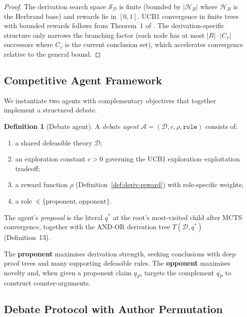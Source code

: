 \documentclass{article}
\theoremstyle{definition}
\newtheorem{definition}[theorem]{Definition}
\newcommand{\D}{\mathcal{D}}
\newcommand{\comp}[1]{\overline{#1}}
\newcommand{\SD}{\mathcal{S}_{\D}}
\begin{document}
\begin{proof}
The derivation search space $\SD$ is finite (bounded by $|\mathcal{H}_B|$ where $\mathcal{H}_B$ is the Herbrand base) and rewards lie in $[0,1]$. UCB1 convergence in finite trees with bounded rewards follows from Theorem~1 of \citet{kocsis2006mcts}. The derivation-specific structure only narrows the branching factor (each node has at most $|R| \cdot |C_v|$ successors where $C_v$ is the current conclusion set), which accelerates convergence relative to the general bound.
\end{proof}

\subsection{Competitive Agent Framework}\label{subsec:agents}

We instantiate two agents with complementary objectives that together implement a structured debate.

\begin{definition}[Debate agent]\label{def:debate-agent}
A \emph{debate agent} $\mathcal{A} = (\D, c, \rho, \texttt{role})$ consists of:
\begin{enumerate}[nosep]
  \item a shared defeasible theory $\D$;
  \item an exploration constant $c > 0$ governing the UCB1 exploration--exploitation tradeoff;
  \item a reward function $\rho$ (Definition~\ref{def:deriv-reward}) with role-specific weights;
  \item a role $\in \{\text{proponent}, \text{opponent}\}$.
\end{enumerate}
The agent's \emph{proposal} is the literal $q^*$ at the root's most-visited child after MCTS convergence, together with the AND-OR derivation tree $T(\D, q^*)$ (Definition~13).
\end{definition}

The \textbf{proponent} maximises derivation strength, seeking conclusions with deep proof trees and many supporting defeasible rules. The \textbf{opponent} maximises novelty and, when given a proponent claim $q_P$, targets the complement $\comp{q_P}$ to construct counter-arguments.

\subsection{Debate Protocol with Author Permutation}\label{subsec:debate-protocol}
\end{document}
